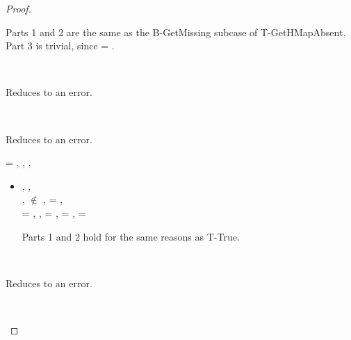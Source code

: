 \begin{lemma}
\begin{proof}
\begin{case}[B-GetMissing]
\begin{itemize}
\begin{subcase}[T-GetHMapPartialDefault]
         Parts 1 and 2 are the same as the B-GetMissing subcase of T-GetHMapAbsent.
         Part 3 is trivial, since \ty{} = \Top.
      \end{subcase}
  \end{itemize}
\end{case}

\begin{case}[BE-Get1]
  \ 

  Reduces to an error.
\end{case}

\begin{case}[BE-Get2]
  \ 

  Reduces to an error.
\end{case}

\begin{case}[B-Assoc]
        \val{} = 
        {
                {\kw{}}{}},
        \opsem {\openv{}}
        {} {},
        \opsem {\openv{}} {} {\kw{}},
        \opsem {\openv{}} {} {}

  \begin{itemize}
    \item[]
      \begin{subcase}[T-AssocHMap]
  \judgementtworewrite {\propenv{}} {} {\HMapgeneric {\mandatory{}} {\absent}} {},
  \judgementtworewrite {\propenv{}} {} {\Value{\kw{}}}{},\\
  \judgementtworewrite {\propenv{}} {} {\ty{}}{},
  {\kw{}} $\not\in$ {\absent{}},
  \ep{} = { {} {}},\\
  \e{} = { {} {}},
  \issubtypein{}{\HMapgeneric {\extendmandatoryset {\mandatory{}}{\kw{}}{\ty{}}} {\absent}}{\ty{}},
  \thenprop{\prop{}} = {\topprop{}},
  \elseprop{\prop{}} = {\botprop{}},
  \object{} = \emptyobject{}

        Parts 1 and 2 hold for the same reasons as T-True.
      \end{subcase}
  \end{itemize}
\end{case}

\begin{case}[BE-Assoc1]
  \ 

  Reduces to an error.
\end{case}

\begin{case}[BE-Assoc2]
  \ 


\end{case}
\end{proof}
\end{lemma}
